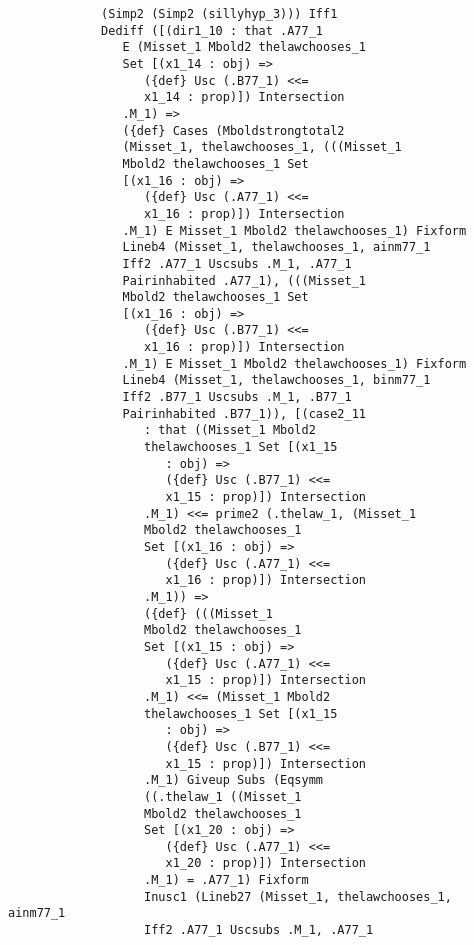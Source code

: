 \documentclass[12pt]{article}
\begin{document}
\begin{verbatim}
             (Simp2 (Simp2 (sillyhyp_3))) Iff1 
             Dediff ([(dir1_10 : that .A77_1 
                E (Misset_1 Mbold2 thelawchooses_1 
                Set [(x1_14 : obj) => 
                   ({def} Usc (.B77_1) <<= 
                   x1_14 : prop)]) Intersection 
                .M_1) => 
                ({def} Cases (Mboldstrongtotal2 
                (Misset_1, thelawchooses_1, (((Misset_1 
                Mbold2 thelawchooses_1 Set 
                [(x1_16 : obj) => 
                   ({def} Usc (.A77_1) <<= 
                   x1_16 : prop)]) Intersection 
                .M_1) E Misset_1 Mbold2 thelawchooses_1) Fixform 
                Lineb4 (Misset_1, thelawchooses_1, ainm77_1 
                Iff2 .A77_1 Uscsubs .M_1, .A77_1 
                Pairinhabited .A77_1), (((Misset_1 
                Mbold2 thelawchooses_1 Set 
                [(x1_16 : obj) => 
                   ({def} Usc (.B77_1) <<= 
                   x1_16 : prop)]) Intersection 
                .M_1) E Misset_1 Mbold2 thelawchooses_1) Fixform 
                Lineb4 (Misset_1, thelawchooses_1, binm77_1 
                Iff2 .B77_1 Uscsubs .M_1, .B77_1 
                Pairinhabited .B77_1)), [(case2_11 
                   : that ((Misset_1 Mbold2 
                   thelawchooses_1 Set [(x1_15 
                      : obj) => 
                      ({def} Usc (.B77_1) <<= 
                      x1_15 : prop)]) Intersection 
                   .M_1) <<= prime2 (.thelaw_1, (Misset_1 
                   Mbold2 thelawchooses_1 
                   Set [(x1_16 : obj) => 
                      ({def} Usc (.A77_1) <<= 
                      x1_16 : prop)]) Intersection 
                   .M_1)) => 
                   ({def} (((Misset_1 
                   Mbold2 thelawchooses_1 
                   Set [(x1_15 : obj) => 
                      ({def} Usc (.A77_1) <<= 
                      x1_15 : prop)]) Intersection 
                   .M_1) <<= (Misset_1 Mbold2 
                   thelawchooses_1 Set [(x1_15 
                      : obj) => 
                      ({def} Usc (.B77_1) <<= 
                      x1_15 : prop)]) Intersection 
                   .M_1) Giveup Subs (Eqsymm 
                   ((.thelaw_1 ((Misset_1 
                   Mbold2 thelawchooses_1 
                   Set [(x1_20 : obj) => 
                      ({def} Usc (.A77_1) <<= 
                      x1_20 : prop)]) Intersection 
                   .M_1) = .A77_1) Fixform 
                   Inusc1 (Lineb27 (Misset_1, thelawchooses_1, ainm77_1 
                   Iff2 .A77_1 Uscsubs .M_1, .A77_1 

\end{verbatim}
\end{document}
